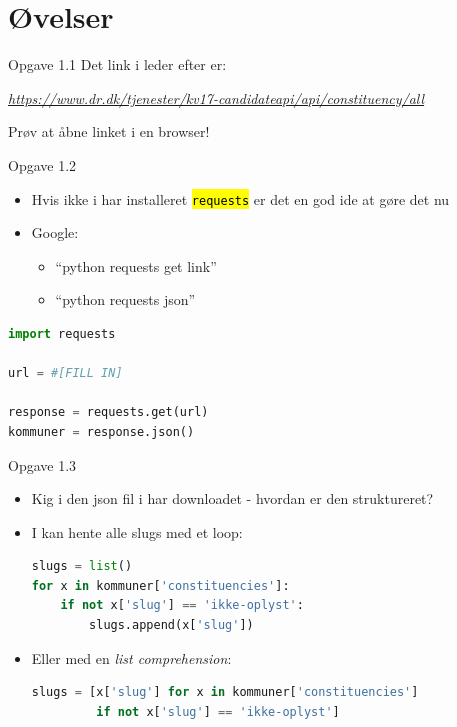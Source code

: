 \documentclass[10pt]{beamer}
\let\OldTexttt\texttt
\renewcommand{\texttt}[1]{\OldTexttt{\hl{#1}}}%
\begin{document}
\section{Øvelser}


\begin{frame}[fragile]{Opgave 1.1}
  Det link i leder efter er:
  \begin{centering}\textit{
  \href{'https://www.dr.dk/tjenester/kv17-candidateapi/api/constituency/all'}{https://www.dr.dk/tjenester/kv17-candidateapi/api/constituency/all}}
  \end{centering}
  Prøv at åbne linket i en browser!
\end{frame}

\begin{frame}[fragile]{Opgave 1.2}
  \begin{itemize}
    \item Hvis ikke i har installeret \texttt{requests} er det en god ide at gøre det nu
    \item Google:
    \begin{itemize}
      \item ``python requests get link''
      \item ``python requests json''
    \end{itemize}
  \end{itemize}

  \begin{lstlisting}[language=python]
import requests

url = #[FILL IN]

response = requests.get(url)
kommuner = response.json()
  \end{lstlisting}
\end{frame}

\begin{frame}[fragile]{Opgave 1.3}
  \begin{itemize}
    \item Kig i den json fil i har downloadet - hvordan er den struktureret?

    \item I kan hente alle slugs med et loop:
    \begin{lstlisting}[language=python]
slugs = list()
for x in kommuner['constituencies']:
    if not x['slug'] == 'ikke-oplyst':
        slugs.append(x['slug'])
    \end{lstlisting}
    \item Eller med en \textit{list comprehension}:
    \begin{lstlisting}[language=python]
slugs = [x['slug'] for x in kommuner['constituencies']
         if not x['slug'] == 'ikke-oplyst']
    \end{lstlisting}
  \end{itemize}
\end{frame}
\end{document}
